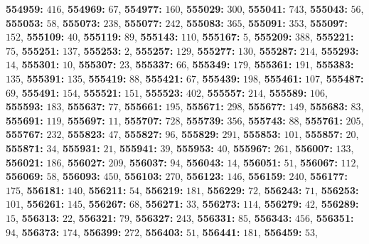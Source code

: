 \textsf{\bfseries 554959:} $416$, \textsf{\bfseries 554969:} $67$, \textsf{\bfseries 554977:} $160$, \textsf{\bfseries 555029:} $300$, \textsf{\bfseries 555041:} $743$, \textsf{\bfseries 555043:} $56$, \textsf{\bfseries 555053:} $58$, \textsf{\bfseries 555073:} $238$, \textsf{\bfseries 555077:} $242$, \textsf{\bfseries 555083:} $365$, \textsf{\bfseries 555091:} $353$, \textsf{\bfseries 555097:} $152$, \textsf{\bfseries 555109:} $40$, \textsf{\bfseries 555119:} $89$, \textsf{\bfseries 555143:} $110$, \textsf{\bfseries 555167:} $5$, \textsf{\bfseries 555209:} $388$, \textsf{\bfseries 555221:} $75$, \textsf{\bfseries 555251:} $137$, \textsf{\bfseries 555253:} $2$, \textsf{\bfseries 555257:} $129$, \textsf{\bfseries 555277:} $130$, \textsf{\bfseries 555287:} $214$, \textsf{\bfseries 555293:} $14$, \textsf{\bfseries 555301:} $10$, \textsf{\bfseries 555307:} $23$, \textsf{\bfseries 555337:} $66$, \textsf{\bfseries 555349:} $179$, \textsf{\bfseries 555361:} $191$, \textsf{\bfseries 555383:} $135$, \textsf{\bfseries 555391:} $135$, \textsf{\bfseries 555419:} $88$, \textsf{\bfseries 555421:} $67$, \textsf{\bfseries 555439:} $198$, \textsf{\bfseries 555461:} $107$, \textsf{\bfseries 555487:} $69$, \textsf{\bfseries 555491:} $154$, \textsf{\bfseries 555521:} $151$, \textsf{\bfseries 555523:} $402$, \textsf{\bfseries 555557:} $214$, \textsf{\bfseries 555589:} $106$, \textsf{\bfseries 555593:} $183$, \textsf{\bfseries 555637:} $77$, \textsf{\bfseries 555661:} $195$, \textsf{\bfseries 555671:} $298$, \textsf{\bfseries 555677:} $149$, \textsf{\bfseries 555683:} $83$, \textsf{\bfseries 555691:} $119$, \textsf{\bfseries 555697:} $11$, \textsf{\bfseries 555707:} $728$, \textsf{\bfseries 555739:} $356$, \textsf{\bfseries 555743:} $88$, \textsf{\bfseries 555761:} $205$, \textsf{\bfseries 555767:} $232$, \textsf{\bfseries 555823:} $47$, \textsf{\bfseries 555827:} $96$, \textsf{\bfseries 555829:} $291$, \textsf{\bfseries 555853:} $101$, \textsf{\bfseries 555857:} $20$, \textsf{\bfseries 555871:} $34$, \textsf{\bfseries 555931:} $21$, \textsf{\bfseries 555941:} $39$, \textsf{\bfseries 555953:} $40$, \textsf{\bfseries 555967:} $261$, \textsf{\bfseries 556007:} $133$, \textsf{\bfseries 556021:} $186$, \textsf{\bfseries 556027:} $209$, \textsf{\bfseries 556037:} $94$, \textsf{\bfseries 556043:} $14$, \textsf{\bfseries 556051:} $51$, \textsf{\bfseries 556067:} $112$, \textsf{\bfseries 556069:} $58$, \textsf{\bfseries 556093:} $450$, \textsf{\bfseries 556103:} $270$, \textsf{\bfseries 556123:} $146$, \textsf{\bfseries 556159:} $240$, \textsf{\bfseries 556177:} $175$, \textsf{\bfseries 556181:} $140$, \textsf{\bfseries 556211:} $54$, \textsf{\bfseries 556219:} $181$, \textsf{\bfseries 556229:} $72$, \textsf{\bfseries 556243:} $71$, \textsf{\bfseries 556253:} $101$, \textsf{\bfseries 556261:} $145$, \textsf{\bfseries 556267:} $68$, \textsf{\bfseries 556271:} $33$, \textsf{\bfseries 556273:} $114$, \textsf{\bfseries 556279:} $42$, \textsf{\bfseries 556289:} $15$, \textsf{\bfseries 556313:} $22$, \textsf{\bfseries 556321:} $79$, \textsf{\bfseries 556327:} $243$, \textsf{\bfseries 556331:} $85$, \textsf{\bfseries 556343:} $456$, \textsf{\bfseries 556351:} $94$, \textsf{\bfseries 556373:} $174$, \textsf{\bfseries 556399:} $272$, \textsf{\bfseries 556403:} $51$, \textsf{\bfseries 556441:} $181$, \textsf{\bfseries 556459:} $53$, 

